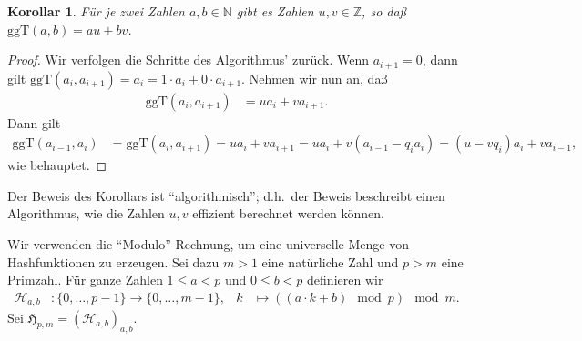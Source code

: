 \documentclass[10pt,reqno]{amsart}
\numberwithin{equation}{section}
\newcommand\ggt{\ggT}
\newcommand\ggT{\mathrm{ggT}}
\newcommand\cH{\mathcal H}
\newcommand\fH{\mathfrak H}
\newcommand\NN{\mathbb N}
\newcommand\ZZ{\mathbb Z}
\newtheorem{corollary}[definition]{Korollar}
\begin{document}
\begin{corollary}\label{cor_euclid}
	F\"ur je zwei Zahlen $a,b\in\NN$ gibt es Zahlen $u,v\in\ZZ$, so da\ss\ $\ggt(a,b)=au+bv$.
\end{corollary}
\begin{proof}
	Wir verfolgen die Schritte des Algorithmus' zur\"uck.
	Wenn $a_{i+1}=0$, dann gilt $\ggt(a_i,a_{i+1})=a_{i}=1\cdot a_{i}+0\cdot a_{i+1}$.
	Nehmen wir nun an, da\ss\
	\begin{align*}
		\ggt(a_i,a_{i+1})&=ua_i+va_{i+1}.
	\end{align*}
	Dann gilt
	\begin{align*}
		\ggt(a_{i-1},a_i)&=\ggt(a_i,a_{i+1})=ua_i+va_{i+1}=ua_i+v(a_{i-1}-q_ia_i)=(u-vq_i)a_i+va_{i-1},
	\end{align*}
	wie behauptet.
\end{proof}

Der Beweis des Korollars ist ``algorithmisch''; d.h.\ der Beweis beschreibt einen Algorithmus, wie die Zahlen $u,v$ effizient berechnet werden k\"onnen.

Wir verwenden die ``Modulo''-Rechnung, um eine universelle Menge von Hashfunktionen zu erzeugen.
Sei dazu $m>1$ eine nat\"urliche Zahl und $p>m$ eine Primzahl.
F\"ur ganze Zahlen $1\leq a<p$ und $0\leq b<p$ definieren wir
	\begin{align*}
		\cH_{a,b}&:\{0,\ldots,p-1\}\to\{0,\ldots,m-1\},&k&\mapsto((a\cdot k+b)\mod p)\mod m.
	\end{align*}
Sei $\fH_{p,m}=(\cH_{a,b})_{a,b}$.
\end{document}
